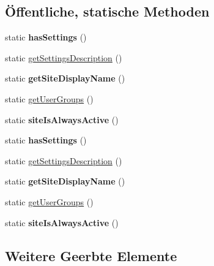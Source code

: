 \subsection*{Öffentliche, statische Methoden}
\begin{DoxyCompactItemize}
\item 
\mbox{\label{class_get_math_captcha_a19b4212e54af62aed67906b77cf4aa0b}} 
static {\bfseries has\+Settings} ()
\item 
static \mbox{\hyperlink{class_get_math_captcha_a5871298bb5783406f5a07d87f1b0d1af}{get\+Settings\+Description}} ()
\item 
\mbox{\label{class_get_math_captcha_afd62ca2c4a45fa9924cdcbc4f94b9140}} 
static {\bfseries get\+Site\+Display\+Name} ()
\item 
static \mbox{\hyperlink{class_get_math_captcha_ac6892757e363876674f9187917959bd7}{get\+User\+Groups}} ()
\item 
\mbox{\label{class_get_math_captcha_a817da50c03b85a725b15c1639b4a6567}} 
static {\bfseries site\+Is\+Always\+Active} ()
\item 
\mbox{\label{class_get_math_captcha_a19b4212e54af62aed67906b77cf4aa0b}} 
static {\bfseries has\+Settings} ()
\item 
static \mbox{\hyperlink{class_get_math_captcha_a5871298bb5783406f5a07d87f1b0d1af}{get\+Settings\+Description}} ()
\item 
\mbox{\label{class_get_math_captcha_afd62ca2c4a45fa9924cdcbc4f94b9140}} 
static {\bfseries get\+Site\+Display\+Name} ()
\item 
static \mbox{\hyperlink{class_get_math_captcha_ac6892757e363876674f9187917959bd7}{get\+User\+Groups}} ()
\item 
\mbox{\label{class_get_math_captcha_a817da50c03b85a725b15c1639b4a6567}} 
static {\bfseries site\+Is\+Always\+Active} ()
\end{DoxyCompactItemize}
\subsection*{Weitere Geerbte Elemente}


